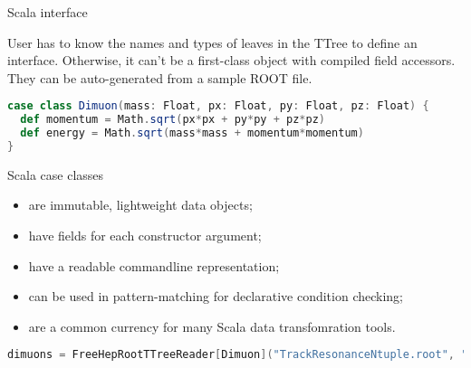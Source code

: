 \documentclass{beamer}
\begin{document}
\begin{frame}[fragile]{Scala interface}

\begin{block}{}
\vspace{-\baselineskip}
User has to know the names and types of leaves in the TTree to define an interface. Otherwise, it can't be a first-class object with compiled field accessors. They can be auto-generated from a sample ROOT file.
\end{block}

\begin{minipage}{1.1\linewidth}
\begin{lstlisting}[language=scala]
case class Dimuon(mass: Float, px: Float, py: Float, pz: Float) {
  def momentum = Math.sqrt(px*px + py*py + pz*pz)
  def energy = Math.sqrt(mass*mass + momentum*momentum)
}
\end{lstlisting}
\end{minipage}

Scala case classes
\begin{itemize}
\item are immutable, lightweight data objects;
\item have fields for each constructor argument;
\item have a readable commandline representation;
\item can be used in pattern-matching for declarative condition checking;
\item are a common currency for many Scala data transfomration tools.
\end{itemize}

\begin{lstlisting}[language=scala]
dimuons = FreeHepRootTTreeReader[Dimuon]("TrackResonanceNtuple.root", "TrackResonanceNtuple/twoMuon")
\end{lstlisting}

\end{frame}
\end{document}
